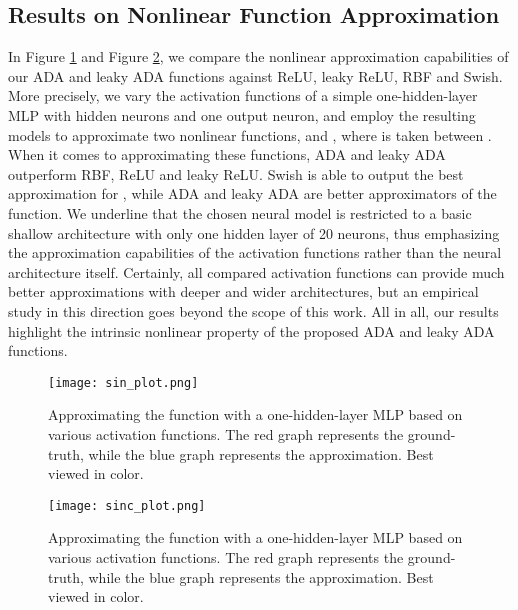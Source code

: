 \documentclass[pdflatex,sn-mathphys]{sn-jnl}
\theoremstyle{thmstyleone}
\theoremstyle{thmstyletwo}\newtheorem{example}{Example}\newtheorem{remark}{Remark}
\theoremstyle{thmstylethree}\newtheorem{definition}{Definition}\DeclareMathOperator{\sinc}{sinc}
\begin{document}
\subsection{Results on Nonlinear Function Approximation}
\label{sec_results_nfa}

In Figure \ref{fig_sin} and Figure \ref{fig_sinc}, we compare the nonlinear approximation capabilities of our ADA and leaky ADA functions against ReLU, leaky ReLU, RBF and Swish. More precisely, we vary the activation functions of a simple one-hidden-layer MLP with  hidden neurons and one output neuron, and employ the resulting models to approximate two nonlinear functions,  and , where  is taken between . When it comes to approximating these functions, ADA and leaky ADA outperform RBF, ReLU and leaky ReLU. Swish is able to output the best approximation for , while ADA and leaky ADA are better approximators of the  function. We underline that the chosen neural model is restricted to a basic shallow architecture with only one hidden layer of 20 neurons, thus emphasizing the approximation capabilities of the activation functions rather than the neural architecture itself. Certainly, all compared activation functions can provide much better approximations with deeper and wider architectures, but an empirical study in this direction goes beyond the scope of this work. All in all, our results highlight the intrinsic nonlinear property of the proposed ADA and leaky ADA functions.

\begin{figure}[!t]
\begin{center}
\centerline{\texttt{[image: sin\_plot.png]}}
\caption{Approximating the  function with a one-hidden-layer MLP based on various activation functions. The red graph represents the ground-truth, while the blue graph represents the approximation. Best viewed in color.}
\label{fig_sin}
\end{center}
\end{figure}

\begin{figure}[!t]
\begin{center}
\centerline{\texttt{[image: sinc\_plot.png]}}
\caption{Approximating the  function with a one-hidden-layer MLP based on various activation functions. The red graph represents the ground-truth, while the blue graph represents the approximation. Best viewed in color.}
\label{fig_sinc}
\end{center}
\end{figure}
\end{document}
